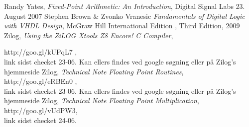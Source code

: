 \documentclass[12pt,a4paper]{article}
\begin{document}







%
%

%
\renewcommand{\refname}{\normalfont\selectfont\normalsize Kildeliste} 
\begin{thebibliography}{9}

   Randy Yates,
  \emph{Fixed-Point Arithmetic: An Introduction},
   Digital Signal Labs
  23. August
  2007
	Stephen Brown \& Zvonko Vranesic
	\emph{Fundamentals of Digital Logic with VHDL Design},
	McGraw Hill International Edition , Third Edition,
	2009
	Zilog,
 \emph{Using the ZiLOG Xtools Z8 Encore! C Compiler},

	http://goo.gl/kUPqL7 , \\ 
	link sidst checket 23-06. Kan ellers findes ved google søgning eller på Zilog's hjemmeside
	Zilog,
	\emph{Technical Note 
Floating Point Routines}, \\
	http://goo.gl/eRBEn0 , \\
	link sidst checket 23-06. Kan ellers findes ved google søgning eller på Zilog's hjemmeside
Zilog,
\emph{Technical Note
Floating Point Multiplication}, \\
http://goo.gl/vUdPW3, \\
link sidst checket 24-06.
\end{thebibliography}
\end{document}
